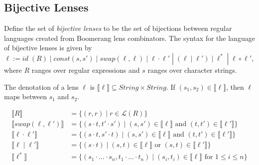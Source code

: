 \documentclass{svproc}
\newcommand{\sep}{\ensuremath{\; | \;}}
\begin{document}
\subsection{Bijective Lenses}
Define the set of \textit{bijective lenses} to be the set of bijections
between regular languages created from Boomerang lens combinators.
The syntax for the language of bijective lenses is given by
$$\ell := \mathit{id} \; (R) \sep const(s, s') \sep  swap(\ell,
\ell) \sep \ell \cdot \ell' \; |  \; (\ell \sep \ell') \sep \ell^* \;
| \; \ell \circ \ell',$$ where $R$ ranges over regular expressions and $s$
ranges over character strings.

The denotation of a lens $\ell$ is $\llbracket \ell \rrbracket \subseteq
\mathit{String} \times \mathit{String}$. If $(s_1, s_2) \in \llbracket \ell
\rrbracket$, then $\ell$ maps between $s_1$ and $s_2$.

\begin{align*}
\llbracket R \rrbracket &= \{(r, r) \sep r \in \mathcal{L}(R)\}\\
\llbracket swap(\ell, \ell') \rrbracket &= \{(s \cdot t, t' \cdot s') \sep
(s, s') \in \llbracket \ell \rrbracket \text{ and } (t, t') \in \llbracket
\ell' \rrbracket\}\\
\llbracket \ell \cdot \ell' \rrbracket &= \{(s \cdot t, s' \cdot t) \sep
(s, s') \in \llbracket \ell \rrbracket \text{ and } (t, t') \in \llbracket
\ell' \rrbracket\}\\
\llbracket \ell \sep \ell' \rrbracket &= \{(s \cdot t) \sep
(s, t) \in \llbracket \ell \rrbracket \text{ or } (s, t) \in \llbracket
\ell' \rrbracket\}\\
\llbracket \ell^* \rrbracket &= \{(s_1 \cdot \ldots \cdot s_n, t_1 \cdot \ldots
\cdot t_n) \sep (s_i, t_i) \in \llbracket \ell \rrbracket \text{ for } 1
\leq i \leq n\}
\end{align*}
\end{document}
